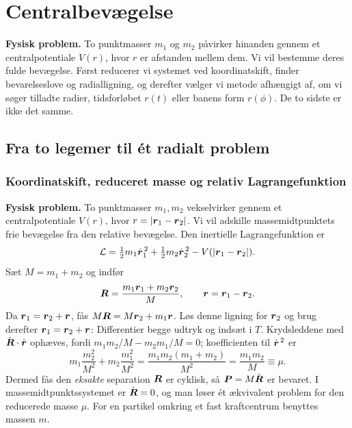 \clearpage\section{Centralbevægelse}\label{sec:central}
\textbf{Fysisk problem.} To punktmasser $m_1$ og $m_2$ påvirker hinanden gennem et centralpotentiale $V(r)$, hvor $r$ er afstanden mellem dem. Vi vil bestemme deres fulde bevægelse. Først reducerer vi systemet ved koordinatskift, finder bevarelseslove og radialligning, og derefter vælger vi metode afhængigt af, om vi søger tilladte radier, tidsforløbet $r(t)$ eller banens form $r(\phi)$. De to sidste er ikke det samme.

\subsection{Fra to legemer til ét radialt problem}
\subsubsection*{Koordinatskift, reduceret masse og relativ Lagrangefunktion}
\label{sec:tolegeme}
\textbf{Fysisk problem.} To punktmasser $m_1,m_2$ vekselvirker gennem et centralpotentiale $V(r)$, hvor $r=|\boldsymbol{r}_1-\boldsymbol{r}_2|$. Vi vil adskille massemidtpunktets frie bevægelse fra den relative bevægelse. Den inertielle Lagrangefunktion er
\[
\mathcal L=\tfrac12m_1\dot{\boldsymbol{r}}_1^{\,2}+\tfrac12m_2\dot{\boldsymbol{r}}_2^{\,2}-V(|\boldsymbol{r}_1-\boldsymbol{r}_2|).
\]
Sæt $M=m_1+m_2$ og indfør
\[
\boldsymbol{R}=\frac{m_1\boldsymbol{r}_1+m_2\boldsymbol{r}_2}{M},\qquad \boldsymbol{r}=\boldsymbol{r}_1-\boldsymbol{r}_2.
\]
Da $\boldsymbol{r}_1=\boldsymbol{r}_2+\boldsymbol{r}$, fås $M\boldsymbol{R}=M\boldsymbol{r}_2+m_1\boldsymbol{r}$. Løs denne ligning for $\boldsymbol{r}_2$ og brug derefter $\boldsymbol{r}_1=\boldsymbol{r}_2+\boldsymbol{r}$:
Differentier begge udtryk og indsæt i $T$. Krydsleddene med $\dot{\boldsymbol{R}}\cdot\dot{\boldsymbol{r}}$ ophæves, fordi
$m_1m_2/M-m_2m_1/M=0$; koefficienten til $\dot{\boldsymbol{r}}^{\,2}$ er
\[
m_1\frac{m_2^2}{M^2}+m_2\frac{m_1^2}{M^2}
=\frac{m_1m_2(m_1+m_2)}{M^2}=\frac{m_1m_2}{M}\equiv\mu.
\]
Dermed fås den \emph{eksakte} separation
$\boldsymbol{R}$ er cyklisk, så $\boldsymbol{P}=M\dot{\boldsymbol{R}}$ er bevaret. I massemidtpunktssystemet er $\dot{\boldsymbol{R}}=0$, og man løser ét ækvivalent problem for den reducerede masse $\mu$. For en partikel omkring et fast kraftcentrum benyttes massen $m$.

